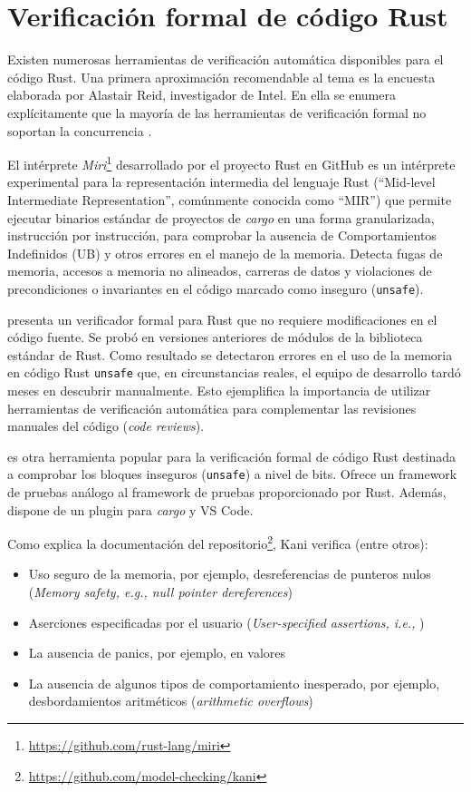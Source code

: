 \section{Verificación formal de código Rust}

Existen numerosas herramientas de verificación automática disponibles para el código Rust.
Una primera aproximación recomendable al tema es la encuesta elaborada por Alastair Reid,
investigador de Intel. En ella se enumera explícitamente que la mayoría de las herramientas de
verificación formal no soportan la concurrencia \cite{reid2021}.

El intérprete \emph{Miri}\footnote{\url{https://github.com/rust-lang/miri}}
desarrollado por el proyecto Rust en GitHub es un intérprete experimental
para la representación intermedia del lenguaje Rust (``Mid-level Intermediate Representation'',
comúnmente conocida como ``\acrshort{MIR}'') que permite ejecutar binarios estándar de proyectos de
\emph{cargo} en una forma granularizada, instrucción por instrucción, para comprobar la ausencia de
Comportamientos Indefinidos (\acrfull{UB}) y otros errores en el manejo de la memoria. Detecta fugas
de memoria, accesos a memoria no alineados, carreras de datos y violaciones de
precondiciones o invariantes en el código marcado como inseguro (\texttt{unsafe}).

\cite{toman2015crust} presenta un verificador formal para Rust que no requiere modificaciones en el
código fuente. Se probó en versiones anteriores de módulos de la biblioteca estándar de Rust. Como
resultado se detectaron errores en el uso de la memoria en código Rust \texttt{unsafe} que,
en circunstancias reales, el equipo de desarrollo tardó meses en descubrir manualmente.
Esto ejemplifica la importancia de utilizar herramientas
de verificación automática para complementar las revisiones manuales del código (\textit{code reviews}).

\cite{kani2023} es otra herramienta popular para la verificación formal de código Rust
destinada a comprobar los bloques inseguros (\texttt{unsafe}) a nivel de bits.
Ofrece un framework de pruebas análogo al framework de pruebas proporcionado por Rust.
Además, dispone de un plugin para \emph{cargo} y VS Code.

Como explica la documentación del repositorio\footnote{\url{https://github.com/model-checking/kani}}, Kani verifica (entre otros):

\begin{itemize}
  \item Uso seguro de la memoria, por ejemplo, desreferencias de punteros nulos (\textit{Memory safety, e.g., null pointer dereferences})
  \item Aserciones especificadas por el usuario (\textit{User-specified assertions, i.e., })
  \item La ausencia de panics, por ejemplo,  en valores 
  \item La ausencia de algunos tipos de comportamiento inesperado, por ejemplo, desbordamientos aritméticos (\textit{arithmetic overflows})
\end{itemize}

